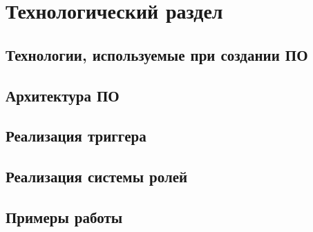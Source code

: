\chapter{Технологический раздел}


\section{Технологии, используемые при создании ПО}
\section{Архитектура ПО}
\section{Реализация триггера}
\section{Реализация системы ролей}
\section{Примеры работы}

